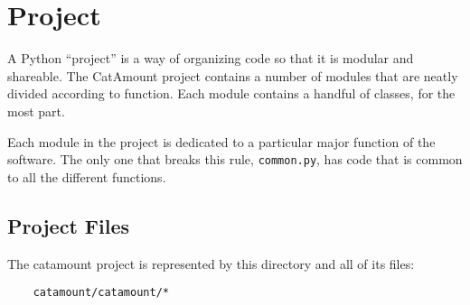 \chapter{Project}
\hypertarget{project}{}

A Python ``project'' is a way of organizing code so that it is
modular and shareable. The CatAmount project contains a number
of modules that are neatly divided according to function. Each
module contains a handful of classes, for the most part.

Each module in the project is dedicated to a particular major
function of the software. The only one that breaks this rule,
\verb=common.py=, has code that is common to all the different
functions.

\section{Project Files}

The catamount project is represented by this directory and all
of its files:

\begin{verbatim}
    catamount/catamount/*
\end{verbatim}

